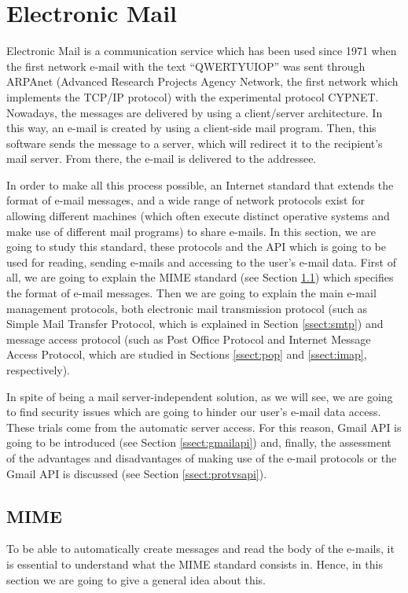 \section{Electronic Mail}
Electronic Mail \citep[Chapter 11]{redhatemail} is a communication service which has been used since 1971 \citep{wikiemail} when the first network e-mail with the text ``QWERTYUIOP'' was sent through ARPAnet (Advanced Research Projects Agency Network, the first network which implements the TCP/IP protocol) with the experimental protocol CYPNET. Nowadays, the messages are delivered by using a client/server architecture. In this way, an e-mail is created by using a client-side mail program. Then, this software sends the message to a server, which will redirect it to the recipient's mail server. From there, the e-mail is delivered to the addressee.

In order to make all this process possible, an Internet standard that extends the format of e-mail messages, and a wide range of network protocols exist for allowing different machines (which often execute distinct operative systems and make use of different mail programs) to share e-mails. In this section, we are going to study this standard, these protocols and the API which is going to be used for reading, sending e-mails and accessing to the user's e-mail data. First of all, we are going to explain the MIME standard (see Section \ref{ssect:mime}) which specifies the format of e-mail messages. Then we are going to explain the main e-mail management protocols, both electronic mail transmission protocol (such as Simple Mail Transfer Protocol, which is explained in Section \ref{ssect:smtp}) and message access protocol (such as Post Office Protocol and Internet Message Access Protocol, which are studied in Sections \ref{ssect:pop} and \ref{ssect:imap}, respectively).

In spite of being a mail server-independent solution, as we will see, we are going to find security issues which are going to hinder our user's e-mail data access. These trials come from the automatic server access. For this reason, Gmail API is going to be introduced (see Section \ref{ssect:gmailapi}) and, finally, the assessment of the advantages and disadvantages of making use of the e-mail protocols or the Gmail API is discussed (see Section \ref{ssect:protvsapi}).

\subsection{MIME} \label{ssect:mime}
To be able to automatically create messages and read the body of the e-mails, it is essential to understand what the MIME standard consists in. Hence, in this section we are going to give a general idea about this.

